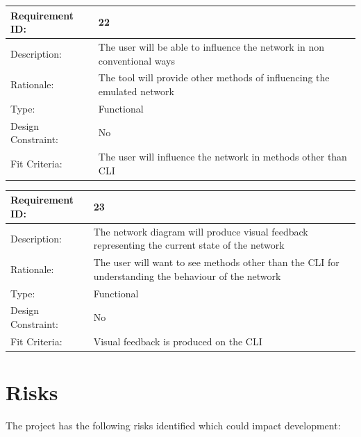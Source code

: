 \documentclass[11pt]{report}
\begin{document}
\newline
\vspace*{0.5 cm}
\newline
\begin{tabular}{|l|p{12cm}|}
	\hline Requirement ID: & 22 \\ 
	\hline Description: & The user will be able to influence the network in non conventional ways \\ 
	\hline Rationale: & The tool will provide other methods of influencing the emulated network \\ 
	\hline Type: & Functional \\ 
	\hline Design Constraint: & No \\ 
	\hline Fit Criteria: & The user will influence the network in methods other than CLI  \\ 
	\hline 
\end{tabular}
\newline
\vspace*{0.5 cm}
\newline
\begin{tabular}{|l|p{12cm}|}
	\hline Requirement ID: & 23 \\ 
	\hline Description: & The network diagram will produce visual feedback representing the current state of the network \\ 
	\hline Rationale: & The user will want to see methods other than the CLI for understanding the behaviour of the network \\ 
	\hline Type: & Functional \\ 
	\hline Design Constraint: & No \\ 
	\hline Fit Criteria: & Visual feedback is produced on the CLI  \\ 
	\hline 
\end{tabular}
\newline
\vspace*{0.5 cm}
\newline

\section{Risks}

The project has the following risks identified which could impact development:
\end{document}
